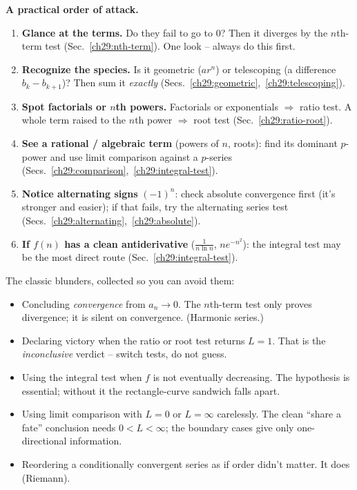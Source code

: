 \begin{focusbox}
\textbf{A practical order of attack.}
\begin{enumerate}
\item \textbf{Glance at the terms.} Do they fail to go to $0$? Then it diverges by the $n$th-term test (Sec.~\ref{ch29:nth-term}). One look -- always do this first.
\item \textbf{Recognize the species.} Is it geometric ($a r^n$) or telescoping (a difference $b_k - b_{k+1}$)? Then sum it \emph{exactly} (Secs.~\ref{ch29:geometric},~\ref{ch29:telescoping}).
\item \textbf{Spot factorials or $n$th powers.} Factorials or exponentials $\Rightarrow$ ratio test. A whole term raised to the $n$th power $\Rightarrow$ root test (Sec.~\ref{ch29:ratio-root}).
\item \textbf{See a rational / algebraic term} (powers of $n$, roots): find its dominant $p$-power and use limit comparison against a $p$-series (Secs.~\ref{ch29:comparison},~\ref{ch29:integral-test}).
\item \textbf{Notice alternating signs} $(-1)^n$: check absolute convergence first (it's stronger and easier); if that fails, try the alternating series test (Secs.~\ref{ch29:alternating},~\ref{ch29:absolute}).
\item \textbf{If $f(n)$ has a clean antiderivative} ($\tfrac1{n\ln n}$, $n e^{-n^2}$): the integral test may be the most direct route (Sec.~\ref{ch29:integral-test}).
\end{enumerate}
\end{focusbox}

\begin{trapbox}
The classic blunders, collected so you can avoid them:
\begin{itemize}
\item Concluding \emph{convergence} from $a_n\to 0$. The $n$th-term test only proves divergence; it is silent on convergence. (Harmonic series.)
\item Declaring victory when the ratio or root test returns $L=1$. That is the \emph{inconclusive} verdict -- switch tests, do not guess.
\item Using the integral test when $f$ is not eventually decreasing. The hypothesis is essential; without it the rectangle-curve sandwich falls apart.
\item Using limit comparison with $L=0$ or $L=\infty$ carelessly. The clean ``share a fate'' conclusion needs $0<L<\infty$; the boundary cases give only one-directional information.
\item Reordering a conditionally convergent series as if order didn't matter. It does (Riemann).
\end{itemize}
\end{trapbox}

